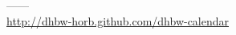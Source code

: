 \documentclass{beamer}
\begin{document}
\begin{frame}
\begin{center}
  \huge ------ \\
  \url{http://dhbw-horb.github.com/dhbw-calendar}
\end{center}
\end{frame}

\end{document}
